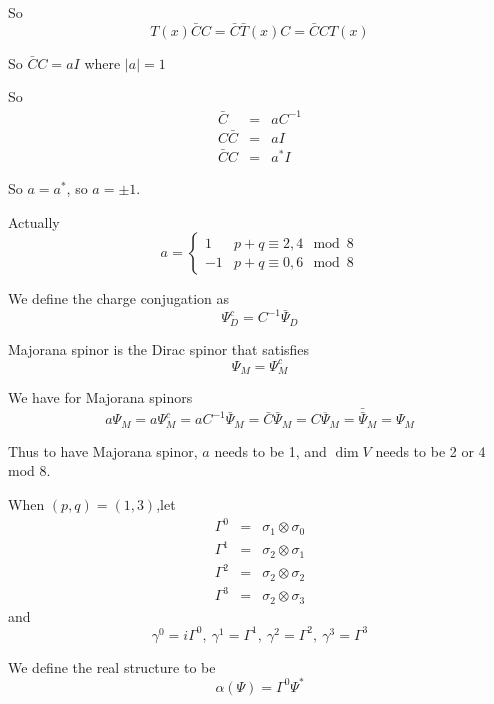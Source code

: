 \documentclass[12pt]{book}
\begin{document}
	So
	\begin{equation}
		T(x)\bar CC=\bar C\bar T(x)C=\bar CCT(x)
	\end{equation}
	
	So $\bar CC=a I$ where $|a|=1$
	
	So
	\begin{eqnarray}
		\bar C&=&a C^{-1}\\
		C \bar C&=&a I\\
		\bar CC&=&a^* I
	\end{eqnarray}
	
	So $a=a^*$, so $a=\pm 1$.
	
	Actually 
	\begin{equation}
		a=\left\{\begin{array}{ll}
			1&p+q\equiv 2,4\mod 8\\
			-1&p+q\equiv 0,6\mod 8 
		\end{array} \right.
	\end{equation}
	
	We define the charge conjugation as 
	\begin{equation}
		\Psi_D^c=C^{-1}\bar \Psi_D
	\end{equation}
	
	Majorana spinor is the Dirac spinor that satisfies
	\begin{equation}
		\Psi_M=\Psi_M^c
	\end{equation}
	
	We have for Majorana spinors
	\begin{equation}
		a \Psi_M=a \Psi^c_M=a C^{-1}\bar\Psi_M=\bar C\bar\Psi_M=\overline{C\Psi_M}=\bar{\bar{\Psi}}_M=\Psi_M
	\end{equation}
	
	Thus to have Majorana spinor, $a$ needs to be 1, and $\dim V$ needs to be 2 or 4 mod 8.
	
	When $(p,q)=(1,3)$,let
	\begin{eqnarray}
		\Gamma^0&=&\sigma_1\otimes\sigma_0\\
		\Gamma^1&=&\sigma_2\otimes\sigma_1\\
		\Gamma^2&=&\sigma_2\otimes\sigma_2\\
		\Gamma^3&=&\sigma_2\otimes\sigma_3
	\end{eqnarray}
	and
	\begin{equation}
		\gamma^0=i\Gamma^0,\ \gamma^1=\Gamma^1,\ \gamma^2=\Gamma^2,\ \gamma^3=\Gamma^3
	\end{equation}
	
	We define the real structure to be 
	\begin{equation}
		\alpha(\Psi)=\Gamma^0\Psi^*
	\end{equation}
	
\end{document}

